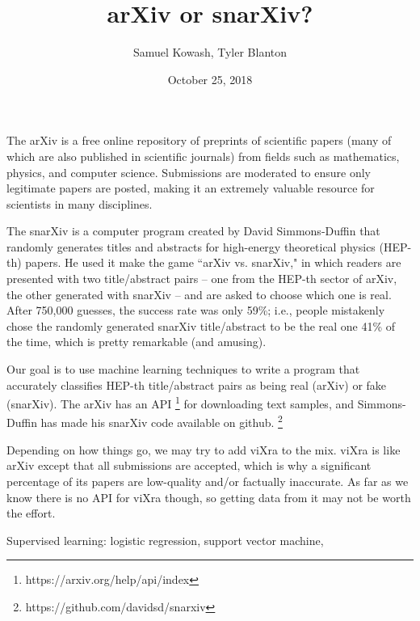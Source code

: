 \documentclass{article}
\title{arXiv or snarXiv?}
\author{Samuel Kowash, Tyler Blanton}
\date{October 25, 2018}
\begin{document}
\maketitle
The arXiv is a free online repository of preprints of scientific papers (many of which are also published in scientific journals) from fields such as mathematics, physics, and computer science.
Submissions are moderated to ensure only legitimate papers are posted, making it an extremely valuable resource for scientists in many disciplines.

The snarXiv is a computer program created by David Simmons-Duffin that randomly generates titles and abstracts for high-energy theoretical physics (HEP-th) papers.
He used it make the game ``arXiv vs. snarXiv," in which readers are presented with two title/abstract pairs -- one from the HEP-th sector of arXiv, the other generated with snarXiv -- and are asked to choose which one is real.
After 750,000 guesses, the success rate was only 59\%; i.e., people mistakenly chose the randomly generated snarXiv title/abstract to be the real one 41\% of the time, which is pretty remarkable (and amusing).

Our goal is to use machine learning techniques to write a program that accurately classifies HEP-th title/abstract pairs as being real (arXiv) or fake (snarXiv).
The arXiv has an API%
\footnote{https://arxiv.org/help/api/index}
for downloading text samples, and Simmons-Duffin has made his snarXiv code available on github.%
\footnote{https://github.com/davidsd/snarxiv}
%




Depending on how things go, we may try to add viXra to the mix.
viXra is like arXiv except that all submissions are accepted, which is why a significant percentage of its papers are low-quality and/or factually inaccurate.
As far as we know there is no API for viXra though, so getting data from it may not be worth the effort.


Supervised learning: logistic regression, support vector machine, 
\end{document}
